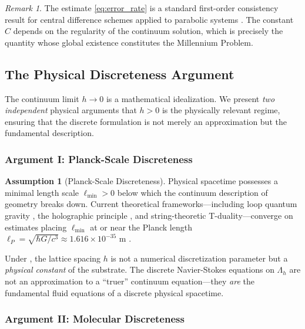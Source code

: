 \documentclass[12pt, a4paper]{article}
\theoremstyle{plain}
\theoremstyle{definition}
\newtheorem{assumption}[theorem]{Assumption}
\theoremstyle{remark}
\newtheorem{remark}[theorem]{Remark}
\begin{document}
\begin{remark}
  The estimate \eqref{eq:error_rate} is a standard first-order consistency
  result for central difference schemes applied to parabolic systems
  \citep{LeVeque2007}. The constant $C$ depends on the regularity of the
  continuum solution, which is precisely the quantity whose global existence
  constitutes the Millennium Problem.
\end{remark}

\subsection{The Physical Discreteness Argument}\label{subsec:physical}

The continuum limit $h \to 0$ is a mathematical idealization. We present
\emph{two independent} physical arguments that $h > 0$ is the physically
relevant regime, ensuring that the discrete formulation is not merely an
approximation but the fundamental description.

\subsubsection{Argument I: Planck-Scale Discreteness}

\begin{assumption}[Planck-Scale Discreteness]\label{asm:planck}
  Physical spacetime possesses a minimal length scale $\ell_{\min} > 0$
  below which the continuum description of geometry breaks down. Current
  theoretical frameworks---including loop quantum gravity \citep{Rovelli2004},
  the holographic principle \citep{tHooft1993}, and string-theoretic
  T-duality---converge on estimates placing $\ell_{\min}$ at or near the
  Planck length $\ell_P = \sqrt{\hbar G / c^3} \approx 1.616 \times 10^{-35}$
  m \citep{Planck1899}.
\end{assumption}

Under , the lattice spacing $h$ is not a numerical
discretization parameter but a \emph{physical constant} of the substrate.
The discrete Navier-Stokes equations on $\Lambda_h$ are not an approximation
to a ``truer'' continuum equation---they \emph{are} the fundamental fluid
equations of a discrete physical spacetime.

\subsubsection{Argument II: Molecular Discreteness}
\end{document}
